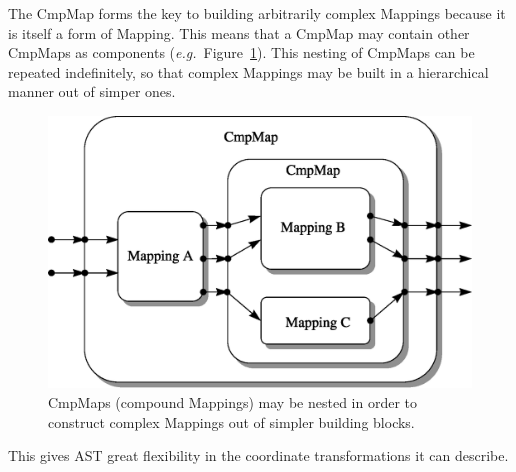 \documentclass[twoside,11pt]{article}
\newenvironment{latexonly}{}{}
\begin{document}
\begin{latexonly}
   The CmpMap forms the key to building arbitrarily complex Mappings
   because it is itself a form of Mapping. This means that a CmpMap may
   contain other CmpMaps as components
   ({\em{e.g.}}\ Figure~\ref{fig:complexcmpmap}). This nesting of CmpMaps
   can be repeated indefinitely, so that complex Mappings may be built in
   a hierarchical manner out of simper ones.
   \begin{figure}
   \begin{center}
   \includegraphics[scale=0.6]{sun211_figures/complex.eps}
   \caption{CmpMaps (compound Mappings) may be nested in order to
   construct complex Mappings out of simpler building blocks.}
   \label{fig:complexcmpmap}
   \end{center}
   \end{figure}
   This gives AST great flexibility in the coordinate transformations it
   can describe.
\end{latexonly}
\end{document}
